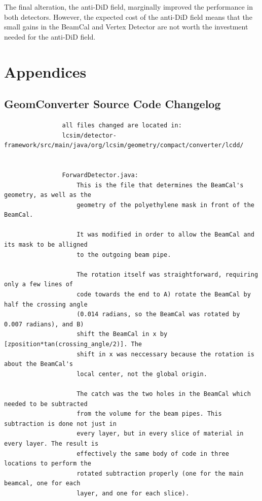 \documentclass{report}
\begin{document}
            The final alteration, the anti-DiD field, marginally improved the performance in both detectors. However, the expected cost of the anti-DiD field means that the small gains in the BeamCal and Vertex Detector are not worth the investment needed for the anti-DiD field.





    \chapter{Appendices}
        \section{GeomConverter Source Code Changelog} \label{sect__geom_changes}
            \begin{verbatim}
                all files changed are located in:
                lcsim/detector-framework/src/main/java/org/lcsim/geometry/compact/converter/lcdd/


                ForwardDetector.java:
                    This is the file that determines the BeamCal's geometry, as well as the
                    geometry of the polyethylene mask in front of the BeamCal.
                    
                    It was modified in order to allow the BeamCal and its mask to be alligned
                    to the outgoing beam pipe.
                    
                    The rotation itself was straightforward, requiring only a few lines of
                    code towards the end to A) rotate the BeamCal by half the crossing angle
                    (0.014 radians, so the BeamCal was rotated by 0.007 radians), and B) 
                    shift the BeamCal in x by [zposition*tan(crossing_angle/2)]. The
                    shift in x was neccessary because the rotation is about the BeamCal's
                    local center, not the global origin. 

                    The catch was the two holes in the BeamCal which needed to be subtracted
                    from the volume for the beam pipes. This subtraction is done not just in
                    every layer, but in every slice of material in every layer. The result is
                    effectively the same body of code in three locations to perform the
                    rotated subtraction properly (one for the main beamcal, one for each
                    layer, and one for each slice). 



\end{verbatim}
\end{document}
